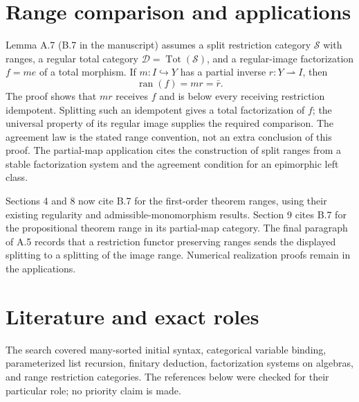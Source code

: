 \documentclass[10pt]{article}
\begin{document}
\section*{Range comparison and applications}
Lemma A.7 (B.7 in the manuscript) assumes a split restriction category
$\mathcal S$ with ranges, a regular total category
$\mathcal D=\operatorname{Tot}(\mathcal S)$, and a regular-image factorization
$f=me$ of a total morphism. If $m:I\hookrightarrow Y$ has a partial inverse
$r:Y\rightharpoonup I$, then
\[
\operatorname{ran}(f)=mr=\bar r.
\]
The proof shows that $mr$ receives $f$ and is below every receiving restriction
idempotent. Splitting such an idempotent gives a total factorization of $f$;
the universal property of its regular image supplies the required comparison.
The agreement law is the stated range convention, not an extra conclusion of
this proof. The partial-map application cites the construction of split ranges
from a stable factorization system and the agreement condition for an
epimorphic left class.

Sections 4 and 8 now cite B.7 for the first-order theorem ranges, using their
existing regularity and admissible-monomorphism results. Section 9 cites B.7
for the propositional theorem range in its partial-map category.
The final paragraph of A.5 records that a restriction functor preserving ranges
sends the displayed splitting to a splitting of the image range. Numerical
realization proofs remain in the applications.

\newpage
\section*{Literature and exact roles}
The search covered many-sorted initial syntax, categorical variable binding,
parameterized list recursion, finitary deduction, factorization systems on
algebras, and range restriction categories. The references below were checked
for their particular role; no priority claim is made.
\end{document}

